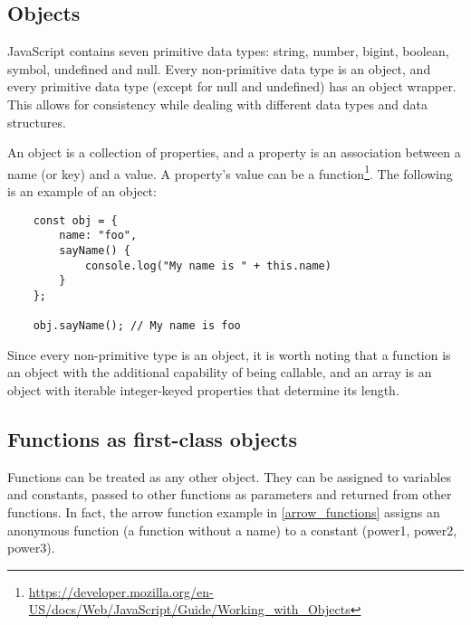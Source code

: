 \documentclass[11pt,a4paper]{article}
\begin{document}
\subsection{\label{objects}Objects}
JavaScript contains seven primitive data types: string, number, bigint, boolean, symbol, undefined and null.
Every non-primitive data type is an object,
and every primitive data type (except for null and undefined) has an object wrapper.
This allows for consistency while dealing with different data types and data structures.

An object is a collection of properties, and a property is an association between a name (or key) and a value.
A property's value can be a
function\footnote{\raggedright \url{https://developer.mozilla.org/en-US/docs/Web/JavaScript/Guide/Working_with_Objects}}.
The following is an example of an object:
\begin{verbatim}
    const obj = {
        name: "foo",
        sayName() {
            console.log("My name is " + this.name)
        }
    };

    obj.sayName(); // My name is foo
\end{verbatim}
Since every non-primitive type is an object, it is worth noting that
a function is an object with the additional capability of being callable,
and an array is an object with iterable integer-keyed properties that determine its length.

\subsection{\label{functions_first_class}Functions as first-class objects}
Functions can be treated as any other object.
They can be assigned to variables and constants, passed to other functions as parameters
and returned from other functions.
In fact, the arrow function example in \ref{arrow_functions}
assigns an anonymous function (a function without a name) to a constant (power1, power2, power3).
\end{document}
